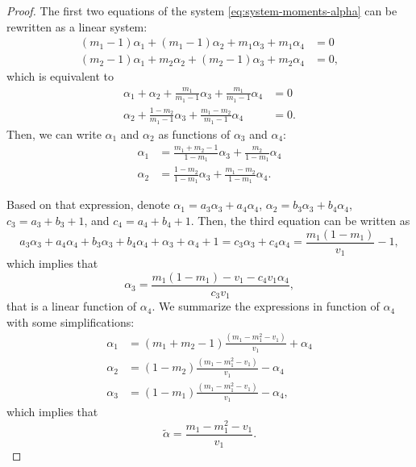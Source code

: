 \begin{proof}
  The first two equations of the system \eqref{eq:system-moments-alpha} can be
rewritten as a linear system:
\begin{align*}
  (m_1 - 1)\alpha_1 + (m_1 - 1)\alpha_2 + m_1\alpha_3 + m_1\alpha_4 &= 0 \\
  (m_2 - 1)\alpha_1 + m_2\alpha_2 + (m_2-1)\alpha_3 + m_2\alpha_4 &= 0,   
\end{align*}
which is equivalent to 
\begin{align*}
  \alpha_1 + \alpha_2 + \frac{m_1}{m_1-1}\alpha_3 + \frac{m_1}{m_1-1}\alpha_4 &= 0 \\
  \alpha_2 + \frac{1-m_2}{m_1-1}\alpha_3 + \frac{m_1-m_2}{m_1-1}\alpha_4 &= 0.
\end{align*}
Then, we can write $\alpha_1$ and $\alpha_2$ as functions of $\alpha_3$ and
$\alpha_4$:
\begin{align}
  \label{eq:alpha1-as-function-alpha3-alpha4}
  \alpha_1 &= \frac{m_1+m_2-1}{1-m_1}\alpha_3 + \frac{m_2}{1-m_1}\alpha_4 \\
  \label{eq:alpha2-as-function-alpha3-alpha4}
  \alpha_2 &= \frac{1-m_2}{1-m_1}\alpha_3 + \frac{m_1-m_2}{1-m_1}\alpha_4.
\end{align}

Based on that expression, denote $\alpha_1 = a_3\alpha_3 + a_4\alpha_4$, $\alpha_2
= b_3\alpha_3 + b_4\alpha_4$, $c_3 = a_3 + b_3 + 1$, and $c_4 = a_4 + b_4 + 1$. Then, the third equation can be written as 
$$
a_3\alpha_3 + a_4\alpha_4 + b_3\alpha_3 + b_4\alpha_4 + \alpha_3 + \alpha_4 + 1 = c_3\alpha_3 + c_4 \alpha_4 = \frac{m_1(1-m_1)}{v_1} - 1, 
$$
which implies that 
$$
\alpha_3 = \frac{m_1(1-m_1) - v_1 - c_4v_1\alpha_4}{c_3v_1},
$$
that is a linear function of $\alpha_4$. We summarize the expressions in function of $\alpha_4$ with some simplifications: 
\begin{align*}
  \alpha_1 &= (m_1 + m_2 - 1)\frac{(m_1 - m_1^2 - v_1)}{v_1} + \alpha_4 \\
  \alpha_2 &=  (1 - m_2)\frac{(m_1 - m_1^2 - v_1)}{v_1} - \alpha_4 \\
  \alpha_3 &= (1-m_1)\frac{(m_1 - m_1^2 - v_1)}{v_1} - \alpha_4,
\end{align*}
which implies that 
$$
\tilde{\alpha} = \frac{m_1 - m_1^2 - v_1}{v_1}.
$$


\end{proof}
